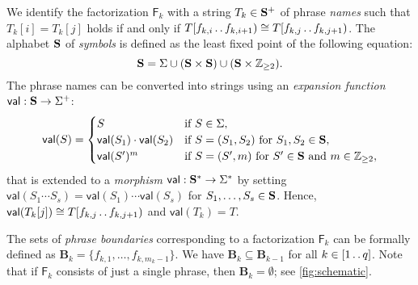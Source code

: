 \documentclass[a4paper]{article}
\theoremstyle{definition}
\theoremstyle{remark}
\newcommand{\B}{\mathbf{B}}
\newcommand{\dd}{\mathinner{\ldotp\ldotp}}
\newcommand{\val}{\mathsf{val}}
\newcommand{\F}{\mathsf{F}}
\begin{document}
We identify the factorization $\F_k$ with a string $T_k\in \mathbf{S}^+$ of phrase \emph{names} such that $T_k[i]=T_k[j]$ holds if and only if $T[f_{k,i}\dd f_{k,i+1})\cong T[f_{k,j}\dd f_{k,j+1})$. The alphabet $\mathbf{S}$ of \emph{symbols} is defined as the least fixed point of the following equation:
 \[\mathbf{S} = \Sigma \cup (\mathbf{S} \times \mathbf{S})\cup (\mathbf{S} \times \mathbb{Z}_{\ge 2} ).\]
The phrase names  can be converted into strings using an \emph{expansion function} $\val: \Symb \to \Sigma^+$:
\[\val(S) = \begin{cases}
  S & \text{if $S\in \Sigma$},\\
  \val(S_1)\cdot \val(S_2) & \text{if $S=(S_1,S_2)$ for $S_1,S_2\in \Symb$},\\
  \val(S')^m & \text{if $S=(S',m)$ for $S'\in \Symb$ and $m\in \mathbb{Z}_{\ge 2}$},
\end{cases}\]
that is extended to a \emph{morphism} $\val : \Symb^*\to \Sigma^*$ by setting $\val(S_1\cdots S_s)=\val(S_1)\cdots \val(S_s)$ for $S_1,\ldots,S_s\in \mathbf{S}$.
Hence, $\val(T_k[j]) \cong T[f_{k,j}\dd f_{k,j+1})$ and $\val(T_k)=T$.

The sets of \emph{phrase boundaries} corresponding to a factorization $\F_k$ can be formally defined as
$\B_k=\{f_{k,1},\ldots,f_{k,m_k-1}\}$.
We have $\B_k \subseteq \B_{k-1}$ for all $k \in [1 \dd q]$.
Note that if $\F_k$ consists of just a single phrase, then $\B_k=\emptyset$; see \cref{fig:schematic}.
\end{document}
